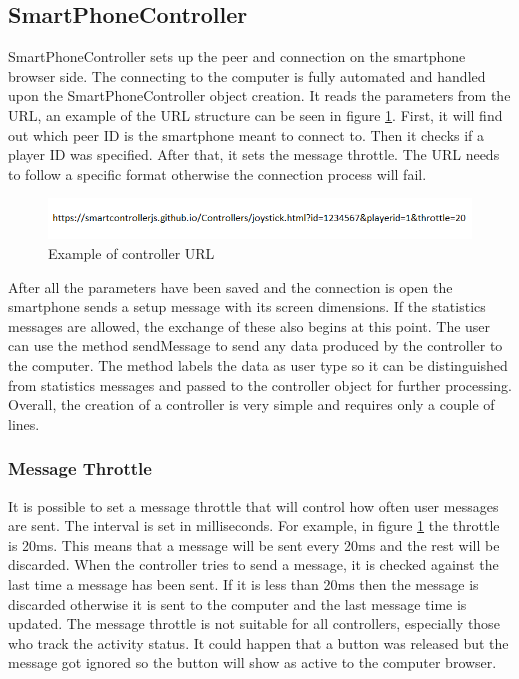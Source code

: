 \documentclass{l4proj}
\begin{document}
 
\subsection{SmartPhoneController}
SmartPhoneController sets up the peer and connection on the smartphone browser side. The connecting to the computer is fully automated and handled upon the SmartPhoneController object creation. It reads the parameters from the URL, an example of the URL structure can be seen in figure \ref{fig:url}. First, it will find out which peer ID is the smartphone meant to connect to. Then it checks if a player ID was specified. After that, it sets the message throttle. The URL needs to follow a specific format otherwise the connection process will fail. \par

\begin{figure}[h!]
    \centering
    \includegraphics[width = \textwidth]{./images/url.png}
    \caption{Example of controller URL}
    \label{fig:url}
\end{figure}

After all the parameters have been saved and the connection is open the smartphone sends a setup message with its screen dimensions. If the statistics messages are allowed, the exchange of these also begins at this point. The user can use the method sendMessage to send any data produced by the controller to the computer. The method labels the data as user type so it can be distinguished from statistics messages and passed to the controller object for further processing. Overall, the creation of a controller is very simple and requires only a couple of lines.

\subsubsection{Message Throttle} It is possible to set a message throttle that will control how often user messages are sent. The interval is set in milliseconds. For example, in figure \ref{fig:url} the throttle is 20ms. This means that a message will be sent every 20ms and the rest will be discarded. When the controller tries to send a message, it is checked against the last time a message has been sent. If it is less than 20ms then the message is discarded otherwise it is sent to the computer and the last message time is updated. The message throttle is not suitable for all controllers, especially those who track the activity status. It could happen that a button was released but the message got ignored so the button will show as active to the computer browser.\par 
\end{document}
